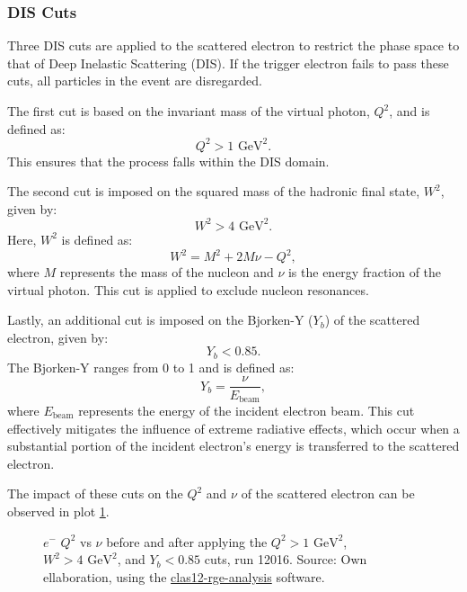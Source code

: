 \subsubsection{DIS Cuts}
\label{sssec::dis_cuts}
    Three DIS cuts are applied to the scattered electron to restrict the phase space to that of Deep Inelastic Scattering (DIS).
    If the trigger electron fails to pass these cuts, all particles in the event are disregarded.

    The first cut is based on the invariant mass of the virtual photon, $Q^2$, and is defined as:
    \begin{equation*}
        Q^2 > 1 \text{ GeV}^2.
    \end{equation*}
    This ensures that the process falls within the DIS domain.

    The second cut is imposed on the squared mass of the hadronic final state, $W^2$, given by:
    \begin{equation*}
        W^2 > 4 \text{ GeV}^2.
    \end{equation*}
    Here, $W^2$ is defined as:
    \begin{equation*}
        W^2 = M^2 + 2M\nu - Q^2,
    \end{equation*}
    where $M$ represents the mass of the nucleon and $\nu$ is the energy fraction of the virtual photon.
    This cut is applied to exclude nucleon resonances.

    Lastly, an additional cut is imposed on the Bjorken-Y ($Y_b$) of the scattered electron, given by:
    \begin{equation*}
        Y_b < 0.85.
    \end{equation*}
    The Bjorken-Y ranges from 0 to 1 and is defined as:
    \begin{equation*}
        Y_b = \frac{\nu}{E_\text{beam}},
    \end{equation*}
    where $E_\text{beam}$ represents the energy of the incident electron beam.
    This cut effectively mitigates the influence of extreme radiative effects, which occur when a substantial portion of the incident electron's energy is transferred to the scattered electron.

    The impact of these cuts on the $Q^2$ and $\nu$ of the scattered electron can be observed in plot \ref{fig::q2vsnu}.

    \begin{figure}[b!]
        \centering{}
        \caption[$Q^2$ vs $\nu$ comparison]{$e^-$ $Q^2$ vs $\nu$ before and after applying the $Q^2 > 1 \text{ GeV}^2$, $W^2 > 4 \text{ GeV}^2$, and $Y_b < 0.85$ cuts, run 12016.
        Source: Own ellaboration, using the \hyperlink{github.com/bleaktwig/clas12-rge-analysis}{clas12-rge-analysis} software.}
        \label{fig::q2vsnu}
    \end{figure}
